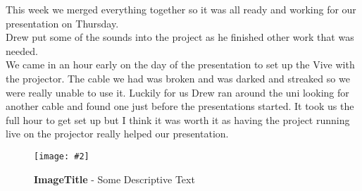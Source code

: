 \documentclass[10pt, a4paper]{article}
\newcommand{\figuremacro}[5]{
    \begin{figure}[#1]
        \centering
        \texttt{[image: \#2]}
        \caption[#3]{\textbf{#3}#4}
        \label{fig:#2}
    \end{figure}
}
\begin{document}
    This week we merged everything together so it was all ready and working for our presentation on Thursday.\\
    
    Drew put some of the sounds into the project as he finished other work that was needed.\\
    
    We came in an hour early on the day of the presentation to set up the Vive with the projector. The cable we had was broken and was darked and streaked so we were really unable to use it. Luckily for us Drew ran around the uni looking for another cable and found one just before the presentations started. It took us the full hour to get set up but I think it was worth it as having the project running live on the projector really helped our presentation.\\
        
    \figuremacro{h}{placeholder}{ImageTitle}{ - Some Descriptive Text}{1.0}

		
\end{document}
